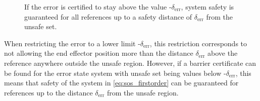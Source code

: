 


\begin{figure}[H]
\centering
{}%
\hspace{3mm}
%
\hspace{3mm}
%
\caption{If the error is certified to stay above the value -$\delta_\text{err}$, system safety is guaranteed for all references up to a safety distance of $\delta_\text{err}$ from the unsafe set.}
	\label{fig:sets_error}
\end{figure}

When restricting the error to a lower limit -$\delta_\text{err}$, this restriction corresponds to not allowing the end effector position more than the distance $\delta_\text{err}$ above the reference anywhere outside the unsafe region. However, if a barrier certificate can be found for the error state system with unsafe set being values below -$\delta_\text{err}$, this means that safety of the system in \autoref{eq:sos_firstorder} can be guaranteed for references up to  the distance $\delta_\text{err}$ from the unsafe region.



